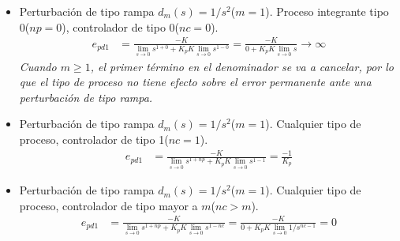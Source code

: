 \begin{ejercicio}
\begin{itemize}
    \item
    Perturbación de tipo rampa $d_m(s)=1/s^2$($m=1$). Proceso integrante tipo 0($np=0$), controlador de tipo 0($nc=0$).
    \begin{align*}
      e_{pd1} &= \frac{-K}
      {\lim_{s\rightarrow 0}s^{1+0} + K_p K\lim_{s\rightarrow 0} s^{1-0}}
      =
      \frac{-K}
      {0 + K_p K\lim_{s\rightarrow 0} s} \rightarrow \infty
    \end{align*}
    \textit{Cuando $m\geq 1$, el primer término en el denominador se va a cancelar, por lo que el tipo de proceso no tiene efecto sobre el error permanente ante una perturbación de tipo rampa.}

    \item
    Perturbación de tipo rampa $d_m(s)=1/s^2$($m=1$). Cualquier tipo de proceso, controlador de tipo 1($nc=1$).
    \begin{align*}
      e_{pd1} &= \frac{-K}
      {\lim_{s\rightarrow 0}s^{1+np} + K_p K\lim_{s\rightarrow 0} s^{1-1}}
      =
      \frac{-1}{K_p}
    \end{align*}

        \item
    Perturbación de tipo rampa $d_m(s)=1/s^2$($m=1$). Cualquier tipo de proceso, controlador de tipo mayor a $m$($nc>m$).
    \begin{align*}
      e_{pd1} &= \frac{-K}
      {\lim_{s\rightarrow 0}s^{1+np} + K_p K\lim_{s\rightarrow 0} s^{1-nc}}
      =
      \frac{-K}
      {0 + K_p K\lim_{s\rightarrow 0} 1/s^{nc-1}} = 0
    \end{align*}

  \end{itemize}

\end{ejercicio}